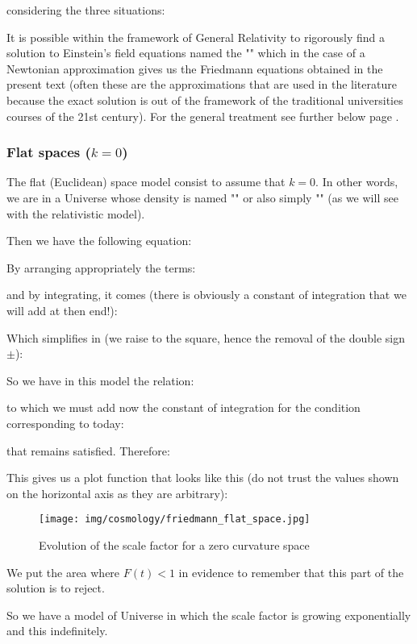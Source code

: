 	considering the three situations:
	
	\begin{tcolorbox}[title=Remark,colframe=black,arc=10pt]
	It is possible within the framework of General Relativity to rigorously find a solution to Einstein's field equations named the "" which in the case of a Newtonian approximation gives us the Friedmann equations obtained in the present text (often these are the approximations that are used in the literature because the exact solution is out of the  framework of the traditional universities courses of the 21st century). For the general treatment see further below page \pageref{Friedmann-Lemaître-Robertson-Walker Cosmological Models}.
	\end{tcolorbox}
	\subsubsection{Flat spaces ($k=0$)}
	The flat (Euclidean) space model consist to assume that $k=0$. In other words, we are in a Universe whose density is named "" or also simply "" (as we will see with the relativistic model).

	Then we have the following equation:
	
	By arranging appropriately the terms:
	
	and by integrating, it comes (there is obviously a constant of integration that we will add at then end!):
	
	Which simplifies in (we raise to the square, hence the removal of the double sign $\pm$):
	
	So we have in this model the relation:
	
	to which we must add now the constant of integration for the condition corresponding to today:
	
	that remains satisfied. Therefore:
	
	This gives us a plot function that looks like this (do not trust the values shown on the horizontal axis as they are arbitrary):
	\begin{figure}[H]
		\centering
		\texttt{[image: img/cosmology/friedmann\_flat\_space.jpg]}	
		\caption{Evolution of the scale factor for a zero curvature space}
	\end{figure}
	We put the area where $F(t)<1$ in evidence to remember that this part of the solution is to reject.

	So we have a model of Universe in which the scale factor is growing exponentially and this indefinitely.
	
